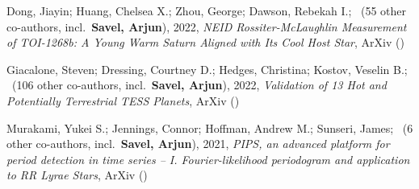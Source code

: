 \item[{\color{numcolor}\scriptsize3}] Dong, Jiayin; Huang, Chelsea X.; Zhou, George; Dawson, Rebekah I.; \etal\ ({55} other co-authors, incl.\ \textbf{Savel, Arjun}), 2022, \emph{NEID Rossiter-McLaughlin Measurement of TOI-1268b: A Young Warm Saturn Aligned with Its Cool Host Star}, ArXiv ()

\item[{\color{numcolor}\scriptsize2}] Giacalone, Steven; Dressing, Courtney D.; Hedges, Christina; Kostov, Veselin B.; \etal\ ({106} other co-authors, incl.\ \textbf{Savel, Arjun}), 2022, \emph{Validation of 13 Hot and Potentially Terrestrial TESS Planets}, ArXiv ()

\item[{\color{numcolor}\scriptsize1}] Murakami, Yukei S.; Jennings, Connor; Hoffman, Andrew M.; Sunseri, James; \etal\ ({6} other co-authors, incl.\ \textbf{Savel, Arjun}), 2021, \emph{PIPS, an advanced platform for period detection in time series -- I. Fourier-likelihood periodogram and application to RR Lyrae Stars}, ArXiv ()